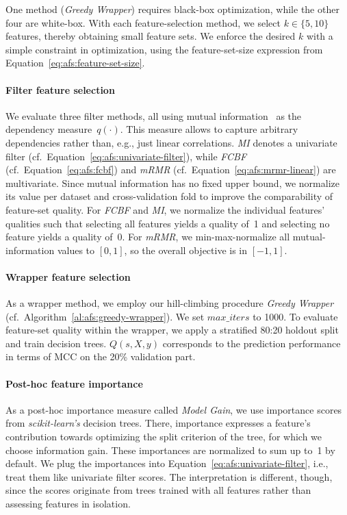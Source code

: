 \documentclass{article}
\theoremstyle{definition}
\begin{document}
One method (\emph{Greedy Wrapper}) requires black-box optimization, while the other four are white-box.
With each feature-selection method, we select $k \in \{5,10\}$ features, thereby obtaining small feature sets.
We enforce the desired $k$ with a simple constraint in optimization, using the feature-set-size expression from Equation~\ref{eq:afs:feature-set-size}.

\paragraph{Filter feature selection}

We evaluate three filter methods, all using mutual information~\cite{kraskov2004estimating} as the dependency measure~$q(\cdot)$.
This measure allows to capture arbitrary dependencies rather than, e.g., just linear correlations.
\emph{MI} denotes a univariate filter (cf.~Equation~\ref{eq:afs:univariate-filter}), while \emph{FCBF} (cf.~Equation~\ref{eq:afs:fcbf}) and \emph{mRMR} (cf.~Equation~\ref{eq:afs:mrmr-linear}) are multivariate.
Since mutual information has no fixed upper bound, we normalize its value per dataset and cross-validation fold to improve the comparability of feature-set quality.
For \emph{FCBF} and \emph{MI}, we normalize the individual features' qualities such that selecting all features yields a quality of~1 and selecting no feature yields a quality of~0.
For \emph{mRMR}, we min-max-normalize all mutual-information values to $[0,1]$, so the overall objective is in $[-1,1]$.

\paragraph{Wrapper feature selection}

As a wrapper method, we employ our hill-climbing procedure \emph{Greedy Wrapper} (cf.~Algorithm~\ref{al:afs:greedy-wrapper}).
We set $max\_iters$ to 1000.
To evaluate feature-set quality within the wrapper, we apply a stratified 80:20 holdout split and train decision trees.
$Q(s,X,y)$ corresponds to the prediction performance in terms of MCC on the 20\% validation part.

\paragraph{Post-hoc feature importance}

As a post-hoc importance measure called \emph{Model Gain}, we use importance scores from \emph{scikit-learn's} decision trees.
There, importance expresses a feature's contribution towards optimizing the split criterion of the tree, for which we choose information gain.
These importances are normalized to sum up to~1 by default.
We plug the importances into Equation~\ref{eq:afs:univariate-filter}, i.e., treat them like univariate filter scores.
The interpretation is different, though, since the scores originate from trees trained with all features rather than assessing features in isolation.
\end{document}
